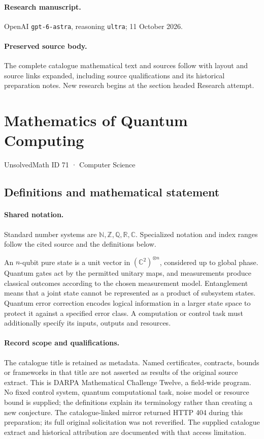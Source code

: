 \documentclass[11pt]{article}
\begin{document}
\paragraph{Research manuscript.} OpenAI \texttt{gpt-6-astra}, reasoning \texttt{ultra}; 11 October 2026.
\paragraph{Preserved source body.} The complete catalogue mathematical text and sources follow with layout and source links expanded, including source qualifications and its historical preparation notes. New research begins at the section headed Research attempt.

\section{Mathematics of Quantum Computing}\label{71}
{\small UnsolvedMath ID 71 · Computer Science}
\subsection{Definitions and mathematical statement}

\paragraph{Shared notation.}Standard number systems are $\mathbb N,\mathbb Z,\mathbb Q,\mathbb R,\mathbb C$. Specialized notation and index ranges follow the cited source and the definitions below.


An $n$-qubit pure state is a unit vector in $(\mathbb C^2)^{\otimes n}$, considered up to global phase. Quantum gates act by the permitted unitary maps, and measurements produce classical outcomes according to the chosen measurement model. Entanglement means that a joint state cannot be represented as a product of subsystem states. Quantum error correction encodes logical information in a larger state space to protect it against a specified error class. A computation or control task must additionally specify its inputs, outputs and resources.
\paragraph{Record scope and qualifications.}
The catalogue title is retained as metadata. Named certificates, contracts, bounds or frameworks in that title are not asserted as results of the original source extract.
This is DARPA Mathematical Challenge Twelve, a field-wide program. No fixed control system, quantum computational task, noise model or resource bound is supplied; the definitions explain its terminology rather than creating a new conjecture. The catalogue-linked mirror returned HTTP 404 during this preparation; its full original solicitation was not reverified. The supplied catalogue extract and historical attribution are documented with that access limitation.
\end{document}
